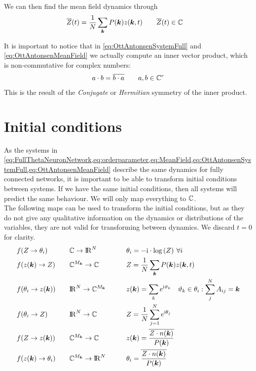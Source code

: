 We can then find the mean field dynamics through
\begin{align}
\overline{Z}(t) &= \frac{1}{N} \sum_{{\boldsymbol{k}}} P({\boldsymbol{k}}) z({\boldsymbol{k}}, t) \qquad \overline{Z}(t) \in {\mathbb{C}} \label{eq:OttAntonsenMeanField}
\end{align}

It is important to notice that in \eqref{eq:OttAntonsenSystemFull} and \eqref{eq:OttAntonsenMeanField} we actually compute an inner vector product, which is non-commutative for complex numbers:
\begin{align}
a \cdot b = \overline{b \cdot a} \qquad a, b \in {\mathbb{C}}^r
\end{align}
This is the result of the \textsl{Conjugate} or \textsl{Hermitian} symmetry of the inner product.


\section{Initial conditions}
As the systems in \cref{eq:FullThetaNeuronNetwork,eq:orderparameter,eq:MeanField,eq:OttAntonsenSystemFull,eq:OttAntonsenMeanField} describe the same dynamics for fully connected networks, it is important to be able to transform initial conditions between systems. If we have the same initial conditions, then all systems will predict the same behaviour. We will only map everything to ${\mathbb{C}}$.\\
The following maps can be used to transform the initial conditions, but as they do not give any qualitative information on the dynamics or distributions of the variables, they are not valid for transforming between dynamics. We discard $t=0$ for clarity.
\begin{alignat*}{3}
&f(Z \rightarrow \theta_i) \quad &&{\mathbb{C}} \rightarrow {\rm I\!R}^N \qquad &&\theta_i = -{\rm{i}} \cdot \log \left( Z \right) \: \forall i\\
&f(z({\boldsymbol{k}}) \rightarrow Z) \quad &&{\mathbb{C}}^{M_{\boldsymbol{k}}} \rightarrow {\mathbb{C}} \qquad &&Z = \frac{1}{N} \sum_{{\boldsymbol{k}}} P({\boldsymbol{k}}) z({\boldsymbol{k}}, t) \\
&f(\theta_i \rightarrow z({\boldsymbol{k}})) \quad &&{\rm I\!R}^N \rightarrow {\mathbb{C}}^{M_{\boldsymbol{k}}} \qquad &&z({\boldsymbol{k}}) = \sum_k e^{{\rm{i}} \vartheta_{k}} \quad \vartheta_{k} \in {\theta_i: \sum_j^N A_{ij} = {\boldsymbol{k}}}\\
&f(\theta_i \rightarrow Z) \quad &&{\rm I\!R}^N \rightarrow {\mathbb{C}} \qquad &&Z = \frac{1}{N} \sum_{j=1}^N e^{{\rm{i}}\theta_j} \\
&f(Z \rightarrow z({\boldsymbol{k}})) \quad &&{\mathbb{C}}^{M_{\boldsymbol{k}}} \rightarrow {\mathbb{C}} \qquad &&z({\boldsymbol{k}}) = \overline{\frac{Z \cdot n({\boldsymbol{k}})}{P({\boldsymbol{k}})}} \\
&f(z({\boldsymbol{k}}) \rightarrow \theta_i) \quad &&{\mathbb{C}}^{M_{\boldsymbol{k}}} \rightarrow {\rm I\!R}^N \qquad &&\theta_i = \overline{\frac{Z \cdot n({\boldsymbol{k}})}{P({\boldsymbol{k}})}}
\end{alignat*}

